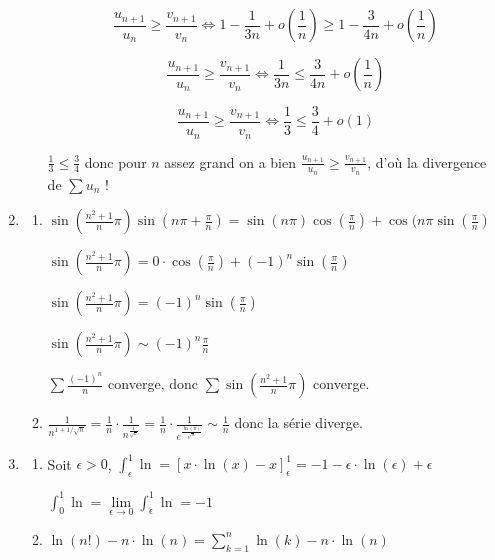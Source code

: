 \documentclass[]{article}
\begin{document}
\begin{enumerate}
\begin{enumerate}
	$$\frac{u_{n+1}}{u_n} \geqslant \frac{v_{n+1}}{v_n} \Longleftrightarrow 1 - \frac{1}{3n} + o\left(\frac{1}{n}\right) \geqslant 1 - \frac{3}{4n} + o\left(\frac{1}{n}\right)$$
	
	$$\frac{u_{n+1}}{u_n} \geqslant \frac{v_{n+1}}{v_n} \Longleftrightarrow \frac{1}{3n} \leqslant \frac{3}{4n} +o\left(\frac{1}{n}\right)$$
	
	$$\frac{u_{n+1}}{u_n} \geqslant \frac{v_{n+1}}{v_n} \Longleftrightarrow \frac{1}{3} \leqslant \frac{3}{4} +o(1)$$
	
	$\frac{1}{3} \leqslant \frac{3}{4}$ donc pour $n$ assez grand on a bien $\frac{u_{n+1}}{u_n} \geqslant \frac{v_{n+1}}{v_n}$, d'où la divergence de $\sum u_n$ !
\end{enumerate}

\item
\begin{enumerate}
	\item $\sin\left(\frac{n^2+1}{n}\pi\right)\sin\left(n\pi+\frac{\pi}{n}\right)=\sin(n\pi)\cos\left(\frac{\pi}{n}\right) + \cos(n\pi\sin\left(\frac{\pi}{n}\right)$
	
	$\sin\left(\frac{n^2+1}{n}\pi\right) = 0 \cdot \cos\left(\frac{\pi}{n}\right) + (-1)^n\sin\left(\frac{\pi}{n}\right)$
	
	$\sin\left(\frac{n^2+1}{n}\pi\right) = (-1)^n\sin\left(\frac{\pi}{n}\right)$
	
	$\sin\left(\frac{n^2+1}{n}\pi\right) \sim (-1)^n \frac{\pi}{n}$
	
	$\sum \frac{(-1)^n}{n}$ converge, donc $\sum\sin\left(\frac{n^2+1}{n}\pi\right)$ converge.
	
	\item
	$\frac{1}{n^{1+1/\sqrt{n}}} = \frac{1}{
	n} \cdot \frac{1}{n^\frac{1}{\sqrt{n}}} = \frac{1}{
		n} \cdot \frac{1}{e^{\frac{\ln(n)}{\sqrt{n}}}} \sim \frac{1}{n}$ donc la série diverge.
\end{enumerate}

\item
\begin{enumerate}
	\item Soit $\epsilon > 0$, $\displaystyle \int_{\epsilon}^{1}\ln = [x\cdot \ln(x)-x]_\epsilon^1=-1-\epsilon\cdot \ln(\epsilon)+\epsilon$
	
	$\displaystyle \int_0^1 \ln = \lim\limits_{\epsilon \to 0} \int_{\epsilon}^{1} \ln = -1$
	
	\item $\ln(n!) - n \cdot \ln(n) = \displaystyle \sum_{k=1}^{n} \ln(k) - n \cdot \ln(n)$
	

\end{enumerate}
\end{enumerate}
\end{document}
